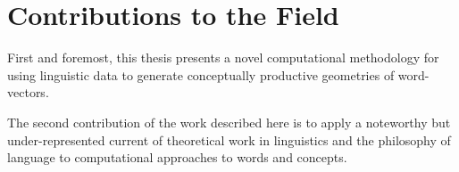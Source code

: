 \section{Contributions to the Field}
First and foremost, this thesis presents a novel computational methodology for using linguistic data to generate conceptually productive geometries of word-vectors.

The second contribution of the work described here is to apply a noteworthy but under-represented current of theoretical work in linguistics and the philosophy of language to computational approaches to words and concepts.
